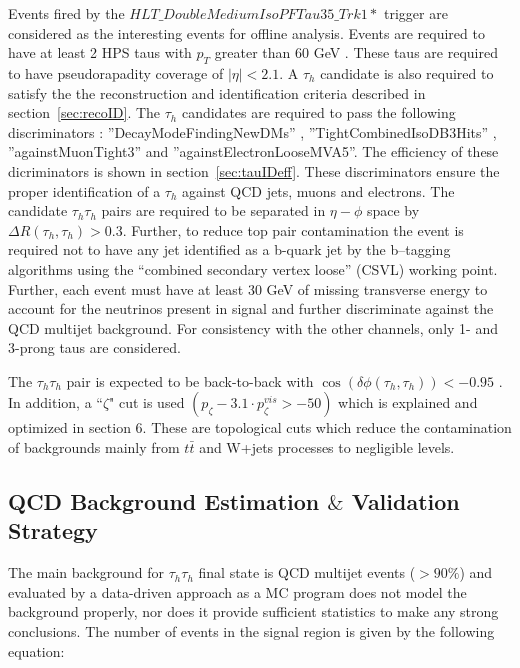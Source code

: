 Events fired by the $HLT\_DoubleMediumIsoPFTau35\_Trk1*$ trigger are considered as the interesting events for offline analysis. Events are required to have at 
least 2 HPS taus with $p_{T}$ greater than 60 GeV . These taus are required to have pseudorapadity coverage of $|\eta| < 2.1$. A $\tau_{h}$ candidate is also 
required to satisfy the the reconstruction and identification criteria described in section~\ref{sec:recoID}. The $\tau_{h}$ candidates are required to pass the 
following discriminators : ''DecayModeFindingNewDMs'' , ''TightCombinedIsoDB3Hits'' , ''againstMuonTight3''  and ''againstElectronLooseMVA5''.  The efficiency of 
these dicriminators is shown in section~\ref{sec:tauIDeff}. These discriminators ensure the proper identification of a $\tau_{h}$ against QCD jets, muons and electrons. The candidate $\tau_{h}\tau_{h}$ pairs are required to be separated in $\eta-\phi$ space by $\Delta R(\tau_{h},\tau_{h}) > 0.3 $. Further, to reduce top pair contamination the event is required not to have any jet identified as a b-quark jet by the b–tagging algorithms using the “combined secondary vertex loose” (CSVL) working point. Further, each event must have at least 30 GeV of missing transverse energy to account for the neutrinos present in signal and further discriminate against the QCD multijet background. For consistency with the other channels, only 1- and 3-prong taus are considered. 

The $\tau_{h}\tau_{h}$ pair is expected to be back-to-back with $\cos(\delta\phi(\tau_{h},\tau_{h})) < -0.95$ . In addition, a ``$\zeta$" cut is used 
$(p_{\zeta}- 3.1\cdot p_{\zeta}^{vis} > -50)$ which is explained and optimized in section 6. These are topological cuts which reduce the contamination of backgrounds mainly from  $t\bar{t}$ and W+jets processes to negligible levels.  



\subsection{QCD Background Estimation $\&$ Validation Strategy}

The main background for $\tau_{h}\tau_{h}$ final state is QCD multijet events ($>90\%$) and evaluated by a data-driven approach as a MC program does not model the background properly, nor does it provide sufficient statistics to make any strong conclusions.
The number of events in the signal region is given by the following equation: 

